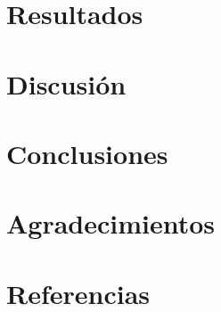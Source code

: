 \documentclass[]{article}
\begin{document}
\section{Resultados}

\section{Discusión}


\section{Conclusiones}
 
\section{Agradecimientos}
\section{Referencias}
\end{document}
